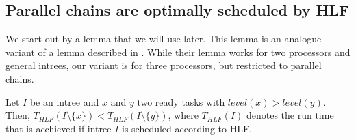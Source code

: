 \subsection{Parallel chains are optimally scheduled by HLF}
\label{sec:parallel-chains-optimally-hlf}

We start out by a lemma that we will use later. This lemma is an analogue variant of a lemma described in \cite{chandyreynoldsshortpaper1975}. While their lemma works for two processors and general intrees, our variant is for three processors, but restricted to parallel chains.

\begin{lemma}
  \label{lemma:parallel-chains-flatness}
  Let $I$ be an intree and $x$ and $y$ two ready tasks with $level(x) > level(y)$. Then, $T_{HLF}(I\setminus\{ x \}) < T_{HLF}(I\setminus\{ y \})$, where $T_{HLF}(I)$ denotes the run time that is acchieved if intree $I$ is scheduled according to HLF.
\end{lemma}

